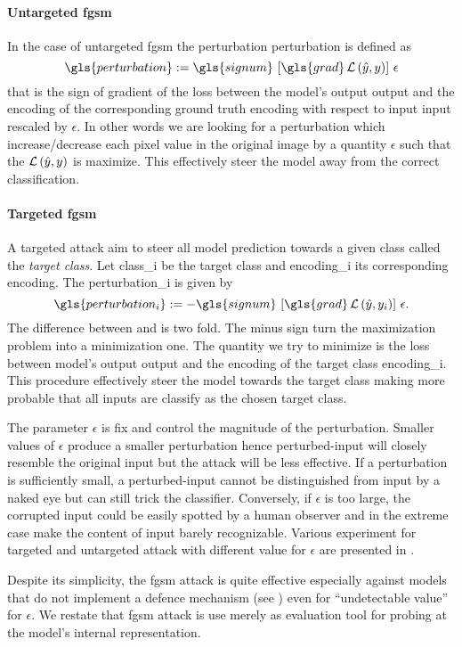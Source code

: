 \paragraph{Untargeted \acrshort{fgsm}} In the case of untargeted \acrshort{fgsm} the perturbation \gls{perturbation} is defined as
\begin{equation}
  \gls{perturbation} :=
  \gls{signum} \, \left[\gls{grad} \Loss\left(\hat{y}, y\right)\right] \, \epsilon
  \label{eq:untargeted-perturbation}
\end{equation}
that is the sign of gradient of the loss between the model's output \gls{output} and the encoding of the corresponding ground truth \gls{encoding} with respect to input \gls{input} rescaled by $\epsilon$. In other words we are looking for a perturbation which increase/decrease each pixel value in the original image by a quantity $\epsilon$ such that the $\operatorname{\mathcal{L}}\left(\hat{y}, y\right)$ is maximize. This effectively steer the model away from the correct classification.

\paragraph{Targeted \acrshort{fgsm}} A targeted attack aim to steer all model prediction towards a given class called the \emph{target class}. Let \gls{class_i} be the target class and \gls{encoding_i} its corresponding encoding. The \gls{perturbation_i} is given by
\begin{equation}
  \gls{perturbation_i} :=
  - \gls{signum} \, \left[\gls{grad} \Loss\left(\hat{y}, y_i\right)\right] \, \epsilon.
  \label{eq:targeted-perturbation}
\end{equation}
The difference between  and  is two fold. The minus sign turn the maximization problem into a minimization one. The quantity we try to minimize is the loss between model's output \gls{output} and the encoding of the target class \gls{encoding_i}. This procedure effectively steer the model towards the target class making more probable that all inputs are classify as the chosen target class.\medskip

The parameter $\epsilon$ is fix and control the magnitude of the perturbation. Smaller values of $\epsilon$ produce a smaller perturbation hence \gls{perturbed-input} will closely resemble the original \gls{input} but the attack will be less effective. If a perturbation is sufficiently small, a \gls{perturbed-input} cannot be distinguished from \gls{input} by a naked eye but can still trick the classifier. Conversely, if $\epsilon$ is too large, the corrupted input could be easily spotted by a human observer and in the extreme case make the content of \gls{input} barely recognizable. Various experiment for targeted and untargeted attack with different value for $\epsilon$ are presented in .\medskip

Despite its simplicity, the \gls{fgsm} attack is quite effective especially against models that do not implement a defence mechanism (see ) even for ``undetectable value'' for $\epsilon$. We restate that \gls{fgsm} attack is use merely as evaluation tool for probing at the model's internal representation.
